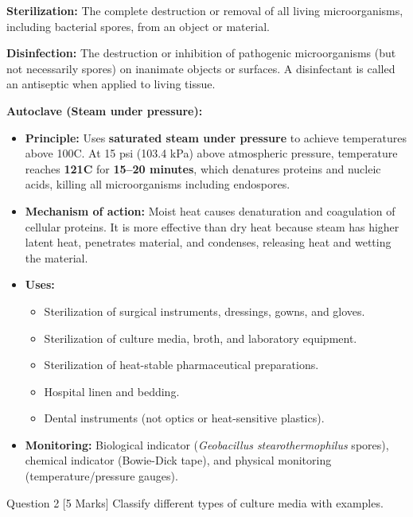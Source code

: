 \documentclass[11pt,a4paper]{article}
\begin{document}
\begin{ansbox}
\textbf{Sterilization:} The complete destruction or removal of all living microorganisms, including bacterial spores, from an object or material.

\textbf{Disinfection:} The destruction or inhibition of pathogenic microorganisms (but not necessarily spores) on inanimate objects or surfaces. A disinfectant is called an antiseptic when applied to living tissue.

\textbf{Autoclave (Steam under pressure):}
\begin{itemize}[leftmargin=*]
    \item \textbf{Principle:} Uses \textbf{saturated steam under pressure} to achieve temperatures above 100\textdegree C. At 15 psi (103.4 kPa) above atmospheric pressure, temperature reaches \textbf{121\textdegree C} for \textbf{15--20 minutes}, which denatures proteins and nucleic acids, killing all microorganisms including endospores.
    \item \textbf{Mechanism of action:} Moist heat causes denaturation and coagulation of cellular proteins. It is more effective than dry heat because steam has higher latent heat, penetrates material, and condenses, releasing heat and wetting the material.
    \item \textbf{Uses:}
    \begin{itemize}
        \item Sterilization of surgical instruments, dressings, gowns, and gloves.
        \item Sterilization of culture media, broth, and laboratory equipment.
        \item Sterilization of heat-stable pharmaceutical preparations.
        \item Hospital linen and bedding.
        \item Dental instruments (not optics or heat-sensitive plastics).
    \end{itemize}
    \item \textbf{Monitoring:} Biological indicator (\textit{Geobacillus stearothermophilus} spores), chemical indicator (Bowie-Dick tape), and physical monitoring (temperature/pressure gauges).
\end{itemize}
\end{ansbox}

\begin{qbox}{Question 2 [5 Marks]}
Classify different types of culture media with examples.
\end{qbox}
\end{document}
